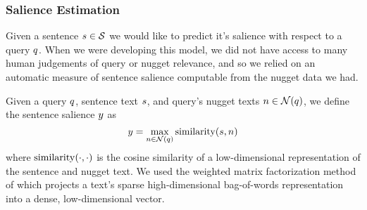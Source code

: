 







  \subsubsection{Salience Estimation}

  















  Given a sentence $s \in \mathcal{S}$ we would like to predict it's 
  salience with respect to a query $q$. When we were developing this 
  model,
  we did not have access to many human judgements of query or nugget relevance,
  and so we relied on an automatic measure of sentence salience computable
 from the nugget data we had.

Given a query $q$, sentence text $s$, and query's nugget texts 
$n \in \mathcal{N}(q)$, we define
the sentence salience $y$ as
\[ 
  y = \max_{n\in \mathcal{N}(q)} \operatorname{similarity}(s, n)
\]
where $\operatorname{similarity}(\cdot, \cdot)$ is the cosine similarity of a
low-dimensional representation of the sentence and nugget text.
We used the weighted matrix factorization method of \cite{guo2012simple}
which projects a text's sparse high-dimensional bag-of-words representation
into a dense, low-dimensional vector. 



